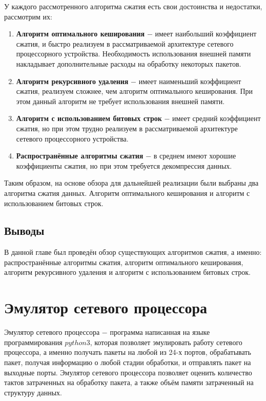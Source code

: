 \documentclass[oneside,final,12pt]{extarticle}
\begin{document}
        У каждого рассмотренного алгоритма сжатия есть свои достоинства и недостатки, рассмотрим их:
        \begin{enumerate}
            \item \textbf{Алгоритм оптимального кеширования} \(-\) имеет наибольший коэффициент сжатия, и быстро реализуем в рассматриваемой архитектуре сетевого процессорного устройства. 
                Необходимость использования внешней памяти накладывает дополнительные расходы на обработку некоторых пакетов.
            \item \textbf{Алгоритм рекурсивного удаления} \(-\) имеет наименьший коэффициент сжатия,
                реализуем сложнее, чем алгоритм оптимального кеширования. При этом данный алгоритм не требует использования внешней памяти.
            \item \textbf{Алгоритм с использованием битовых строк} \(-\) имеет средний коэффициент сжатия, но при этом трудно реализуем в рассматриваемой архитектуре сетевого процессорного устройства.
            \item \textbf{Распространённые алгоритмы сжатия} \(-\) в среднем имеют хорошие коэффициенты сжатия, но при этом требуется декомпрессия данных.
        \end{enumerate}
        
        Таким образом, на основе обзора для дальнейшей реализации были выбраны два алгоритма сжатия данных. Алгоритм оптимального кеширования и алгоритм с использованием битовых строк.

        \subsection{Выводы}
        В данной главе был проведён обзор существующих алгоритмов сжатия, а именно: распространённые алгоритмы сжатия, алгоритм оптимального кеширования, алгоритм рекурсивного удаления 
        и алгоритм с использованием битовых строк.
    \section{Эмулятор сетевого процессора}
        Эмулятор сетевого процессора $-$ программа написанная на языке программирования $python3$, которая позволяет эмулировать работу сетевого процессора, 
        а именно получать пакеты на любой из 24-х портов, обрабатывать пакет, получая информацию о любой стадии обработки, и отправлять пакет на выходные порты.
        Эмулятор сетевого процессора позволяет оценить количество тактов затраченных на обработку пакета, а также объём памяти затраченный на структуру данных.
\end{document}
